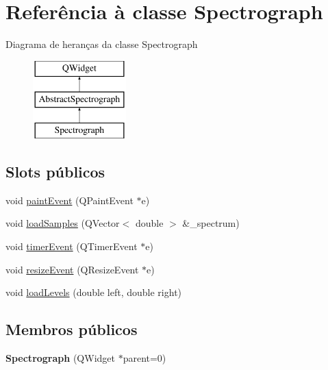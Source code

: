 \hypertarget{class_spectrograph}{\section{Referência à classe Spectrograph}
\label{class_spectrograph}
}
Diagrama de heranças da classe Spectrograph\begin{figure}[H]
\begin{center}
\leavevmode
\includegraphics[height=3.000000cm]{class_spectrograph}
\end{center}
\end{figure}
\subsection*{Slots públicos}
\begin{DoxyCompactItemize}
\item 
void \hyperlink{class_spectrograph_a22138fa296829fb5449202f262e64bf5}{paint\-Event} (Q\-Paint\-Event $\ast$e)
\item 
void \hyperlink{class_spectrograph_ae94e6b07459f40c57ed7db97f5d32cf1}{load\-Samples} (Q\-Vector$<$ double $>$ \&\-\_\-spectrum)
\item 
void \hyperlink{class_spectrograph_af690851ad862181732979bdfa88b2dbe}{timer\-Event} (Q\-Timer\-Event $\ast$e)
\item 
void \hyperlink{class_spectrograph_a06514c3f632bc47c7da2cfd66330e85e}{resize\-Event} (Q\-Resize\-Event $\ast$e)
\item 
void \hyperlink{class_spectrograph_aeb2d9200c513b1de462de5f16c4cb0ca}{load\-Levels} (double left, double right)
\end{DoxyCompactItemize}
\subsection*{Membros públicos}
\begin{DoxyCompactItemize}
\item 
\hypertarget{class_spectrograph_ae4a10124a7de6cec48ccd09db0ab5fb6}{{\bfseries Spectrograph} (Q\-Widget $\ast$parent=0)}\label{class_spectrograph_ae4a10124a7de6cec48ccd09db0ab5fb6}

\end{DoxyCompactItemize}


